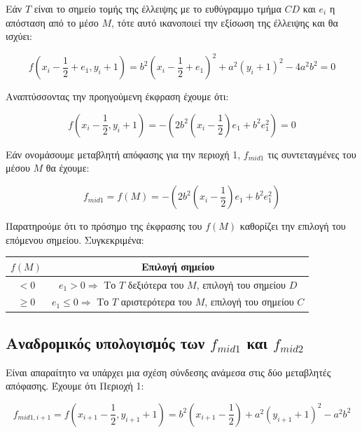 Εάν $T$ είναι το σημείο τομής της έλλειψης με το ευθύγραμμο τμήμα $CD$ και $e_i$ η απόσταση από το μέσο $M$, τότε αυτό ικανοποιεί την εξίσωση της έλλειψης και θα ισχύει:

\begin{equation}
    f \left( x_i - \frac{1}{2} + e_1, y_i + 1 \right) = b^2 \left( x_i - \frac{1}{2} + e_1 \right)^2 + a^2 (y_i + 1)^2 - 4a^2b^2 = 0
\end{equation}

Αναπτύσσοντας την προηγούμενη έκφραση έχουμε ότι:

\begin{equation}
    f \left( x_i - \frac{1}{2}, y_i + 1 \right) = - \left( 2b^2 \left( x_i - \frac{1}{2} \right) e_1 + b^2 e_1^2 \right) = 0
\end{equation}

Εάν ονομάσουμε μεταβλητή απόφασης για την περιοχή 1, $f_{mid1}$ τις συντεταγμένες του μέσου $M$ θα έχουμε:

\begin{equation}
    f_{mid1} = f(M) = - \left( 2b^2 \left( x_i - \frac{1}{2} \right) e_1 + b^2 e_1^2 \right)
\end{equation}

Παρατηρούμε ότι το πρόσημο της έκφρασης του $f(M)$ καθορίζει την επιλογή του επόμενου σημείου. Συγκεκριμένα:

\begin{table}[htb]
    \centering
    \begin{tabular}{@{}c|c@{}}
        \toprule
        $f(M)$ & Επιλογή σημείου \\  \midrule
        $< 0$ & $e_1 > 0 \Rightarrow$ Το $T$ δεξιότερα του $M$, επιλογή του σημείου $D$ \\
        $\geq 0$ & $e_1 \leq 0 \Rightarrow$ Το $T$ αριστερότερα του $M$, επιλογή του σημείου $C$ \\
        \bottomrule
    \end{tabular}
\end{table}

\subsection{Αναδρομικός υπολογισμός των $f_{mid1}$ και $f_{mid2}$}

Είναι απαραίτητο να υπάρχει μια σχέση σύνδεσης ανάμεσα στις δύο μεταβλητές απόφασης. Έχουμε ότι Περιοχή 1:

\begin{equation}
    f_{mid1, i+1} = f(x_{i+1} - \frac{1}{2}, y_{i+1} + 1) = b^2 (x_{i+1} - \frac{1}{2}) + a^2(y_{i+1} + 1)^2 - a^2b^2
\end{equation}

